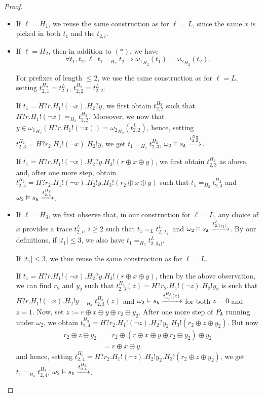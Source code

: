 \documentclass[preprint,5p,twocolumn]{elsarticle}
\begin{document}
\begin{proof}
\begin{itemize}
  \item If $\ell = H_1$, we reuse the same construction as for $\ell = L$, since the same $x$ is picked
    in both $t_1$ and the $t_{2,i}$.

  \item If $\ell = H_2$, then in addition to $(*)$, we have
    $$\forall t_1,t_2,\ell.~t_1 =_{H_2} t_2 \Longrightarrow {\omega_1}_{H_2}(t_1) = {\omega_2}_{H_2}(t_2).$$

    For prefixes of length $\leq 2$, we use the same construction as for $\ell = L$, setting $t^{H_2}_{2,1} = t^L_{2,1}$,
    $t^{H_2}_{2,2} = t^L_{2,2}$.

    If $t_1 = H?r.H_1!(\neg x).H_2?y$, we first obtain $t^{H_2}_{2,2}$ such that $H?r.H_1!(\neg x) =_{H_2} t^{H_2}_{2,2}$. Moreover,
    we now that $y \in {\omega_1}_{H_2}(H?r.H_1!(\neg x)) = {\omega_2}_{H_2}(t^L_{2,2})$, hence, setting
    $t^{H_2}_{2,3}=H?r_2.H_1!(\neg x).H_2!y$, we get $t_1 =_{H_2} t^{H_2}_{2,3}$,
    $\omega_2 \vDash s_{\mathtt{A}}  \xrightarrow{t^{H_2}_{2,3}}$.

    If $t_1 = H?r.H_1!(\neg x).H_2?y.H_3!(r \oplus x \oplus y)$, we first obtain $t^{H_2}_{2,3}$ as above, and, after one more step,
    obtain $t^{H_2}_{2,4}=H?r_2.H_1!(\neg x).H_2!y.H_3!(r_2\oplus x \oplus y)$ such that $t_1 =_{H_2} t^{H_2}_{2,4}$ and $\omega_2 \vDash s_{\mathtt{A}}  \xrightarrow{t^{H_2}_{2,4}}$.

  \item If $\ell = H_3$, we first observe that, in our construction for $\ell = L$, any choice of $x$ provides a trace
    $t^L_{2,i}$, $i \geq 2$ such that $t_1 =_L t^L_{2,|t_1|}$ and $\omega_2 \vDash s_{\mathtt{A}} \xrightarrow{t^L_{2,|t_1|}}$. By our definitions,
    if $|t_1| \leq 3$, we also have $t_1 =_{H_3} t^L_{2,|t_1|}$.

    If $|t_1| \leq 3$, we thus reuse the same construction as for $\ell=L$.

    If $t_1 = H?r.H_1!(\neg x).H_2?y.H_3!(r \oplus x \oplus y)$, then  by the above observation, 
    we can find $r_2$ and $y_2$ such that $t^{H_3}_{2,3}(z)=H?r_2.H_1!(\neg z).H_2!y_2$ is such that
    $H?r.H_1!(\neg x).H_2!y =_{H_3} t^{H_3}_{2,3}(z)$
    and $\omega_2 \vDash s_{\mathtt{A}}  \xrightarrow{t^{H_3}_{2,3}(z)}$ for both $z=0$ and $z=1$. Now, set
    $z := r \oplus x \oplus y \oplus r_2 \oplus y_2$. After one more step of $P_{\mathtt{A}}$ running
    under $\omega_2$, we obtain $t^{H_3}_{2,4}=H?r_2.H_1!(\neg z).H_2?y_2.H_3!(r_2 \oplus z \oplus y_2)$.
    But now
    \begin{align*}
      r_2 \oplus z \oplus y_2 &= r_2 \oplus (r \oplus x \oplus y \oplus r_2 \oplus y_2) \oplus y_2 \\
                              &= r \oplus x \oplus y,
    \end{align*}
    and hence, setting $t^{H_3}_{2,4}=H?r_2.H_1!(\neg z).H_2!y_2.H_3!(r_2 \oplus z \oplus y_2)$, we get
    $t_1 =_{H_3} t^{H_3}_{2,4}$,  $\omega_2 \vDash s_{\mathtt{A}} \xrightarrow{t^{H_3}_{2,4}}$.
  \end{itemize}


\end{proof}
\end{document}
